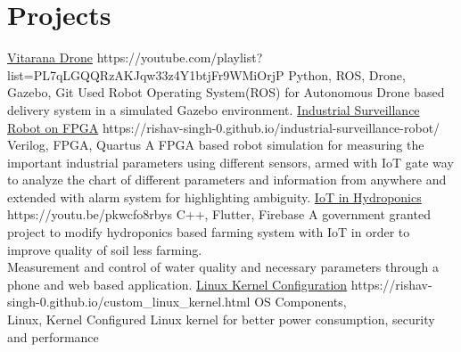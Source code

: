 \documentclass[%
               doublesided,
               paper=a4,
               fontsize=10pt
              ]{my-resume}
\begin{document}
{    \section[\faRocket]{Projects}
        {\href{https://youtube.com/playlist?list=PL7qLGQQRzAKJqw33z4Y1btjFr9WMiOrjP}{Vitarana Drone}}
        {https://youtube.com/playlist?list=PL7qLGQQRzAKJqw33z4Y1btjFr9WMiOrjP}
        {Python, ROS, Drone, \\Gazebo, Git}
        {Used Robot Operating System(ROS) for Autonomous Drone based delivery system in a simulated Gazebo environment. }
        {\href{https://rishav-singh-0.github.io/industrial-surveillance-robot/}{Industrial Surveillance Robot on FPGA}}
        {https://rishav-singh-0.github.io/industrial-surveillance-robot/}
        {Verilog, FPGA, Quartus}
        {A FPGA based robot simulation for measuring the important industrial parameters using different sensors, armed with IoT gate way to analyze the chart of different parameters and information from anywhere and extended with alarm system for highlighting ambiguity. }
        {\href{https://youtu.be/pkwcfo8rbys}{IoT in Hydroponics}}
        {https://youtu.be/pkwcfo8rbys}
        {C++, Flutter, Firebase}
        {A government granted project to modify hydroponics based farming system with IoT in order to improve quality of soil less farming.
        \\Measurement and control of water quality and necessary parameters through a phone and web based application. }
        {\href{https://rishav-singh-0.github.io/custom_linux_kernel.html}{Linux Kernel Configuration}}
        {https://rishav-singh-0.github.io/custom_linux_kernel.html}
        {OS Components, \\Linux, Kernel}
        {Configured Linux kernel for better power consumption, security and performance }
    
        
}
\makebody
\clearpage
\end{document}
